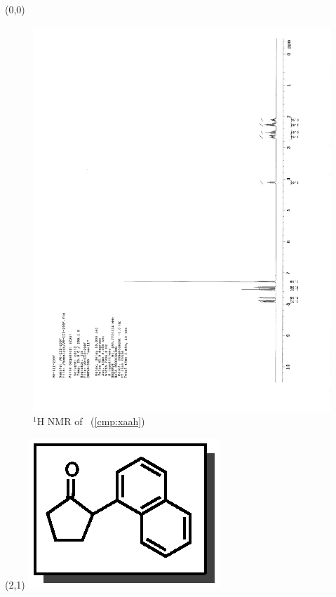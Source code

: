 \begin{textblock}{20}(0,0)
\begin{figure}[htb]
\caption{$^1$H NMR of \CMPxaah\ (\ref{cmp:xaah})}
\includegraphics[scale=0.75, trim = 0mm 0mm 0mm 5mm,
clip]{chp_asymmetric/images/nmr/xaahH}
\vspace{-100pt}
\end{figure}
\end{textblock}
\begin{textblock}{1}(2,1)
\includegraphics[scale=0.8, angle=90]{chp_asymmetric/images/xaah}
\end{textblock}
